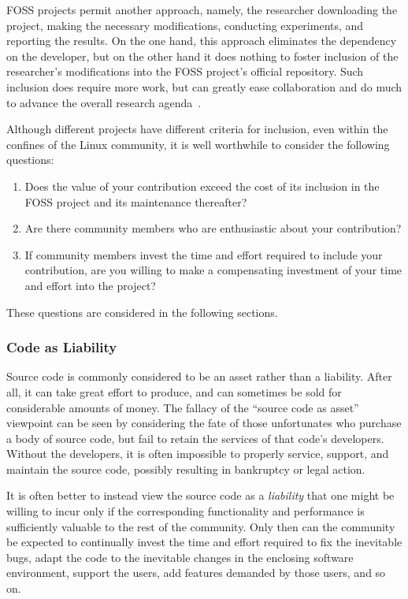 FOSS projects permit another approach, namely, the researcher
downloading the project, making the necessary modifications, conducting
experiments, and reporting the results.
On the one hand, this approach eliminates the dependency on the developer,
but on the other hand it does nothing to foster inclusion of the researcher's
modifications into the FOSS project's official repository.
Such inclusion does require more work, but can greatly ease collaboration
and do much to advance the overall research agenda~\cite{MuliBenYehuda2008OSR}.

Although different projects have different criteria for inclusion,
even within the confines of the Linux community, it is well worthwhile
to consider the following questions:

\begin{enumerate}
\item	Does the value of your contribution exceed the cost of
	its inclusion in the FOSS project and its maintenance
	thereafter?
\item	Are there community members who are enthusiastic about
	your contribution?
\item	If community members invest the time and effort required
	to include your contribution, are you willing to make
	a compensating investment of your time and effort into
	the project?
\end{enumerate}

These questions are considered in the following sections.

\subsubsection{Code as Liability}
\label{sec:app:rcuhist:Code as Liability}

Source code is commonly considered to be an asset rather than a
liability.
After all, it can take great effort to produce, and can sometimes
be sold for considerable amounts of money.
The fallacy of the ``source code as asset'' viewpoint can be seen
by considering the fate of those unfortunates who purchase a body
of source code, but fail to retain the services of that code's developers.
Without the developers, it is often impossible to properly service,
support, and maintain the source code, possibly resulting in
bankruptcy or legal action.

It is often better to instead view the source code as a \emph{liability}
that one might be willing to incur only if the corresponding functionality
and performance is sufficiently valuable to the rest of the community.
Only then can the community be expected to continually invest the time
and effort required to fix the inevitable bugs, adapt the code to the
inevitable changes in the enclosing software environment, support the
users, add features demanded by those users, and so on.

